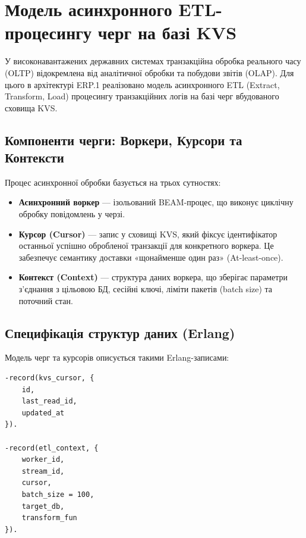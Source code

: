 \section{Модель асинхронного ETL-процесингу черг на базі KVS}
   
У високонавантажених державних системах транзакційна обробка реального часу (OLTP) відокремлена від аналітичної обробки та побудови звітів (OLAP). Для цього в архітектурі ERP.1 реалізовано модель асинхронного ETL (Extract, Transform, Load) процесингу транзакційних логів на базі черг вбудованого сховища KVS.

\subsection{Компоненти черги: Воркери, Курсори та Контексти}
Процес асинхронної обробки базується на трьох сутностях:
\begin{itemize}
    \item \textbf{Асинхронний воркер} --- ізольований BEAM-процес, що виконує циклічну обробку повідомлень у черзі.
    \item \textbf{Курсор (Cursor)} --- запис у сховищі KVS, який фіксує ідентифікатор останньої успішно обробленої транзакції для конкретного воркера. Це забезпечує семантику доставки «щонайменше один раз» (At-least-once).
    \item \textbf{Контекст (Context)} --- структура даних воркера, що зберігає параметри з'єднання з цільовою БД, сесійні ключі, ліміти пакетів (batch size) та поточний стан.
\end{itemize}

\subsection{Специфікація структур даних (Erlang)}
Модель черг та курсорів описується такими Erlang-записами:
\begin{lstlisting}
-record(kvs_cursor, {
    id,
    last_read_id,
    updated_at
}).

-record(etl_context, {
    worker_id,
    stream_id,
    cursor,
    batch_size = 100,
    target_db,
    transform_fun
}).
\end{lstlisting}

